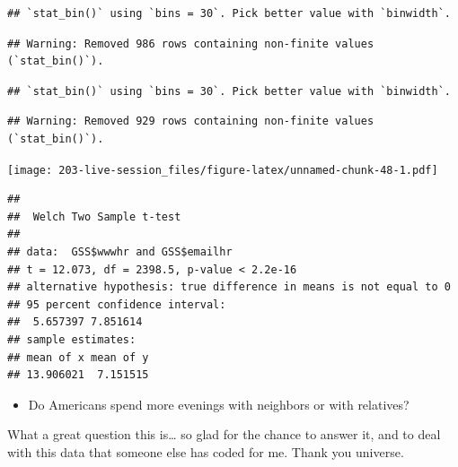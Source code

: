 \documentclass[
]{book}
\newenvironment{Shaded}{\begin{snugshade}}{\end{snugshade}}
\newcommand{\AttributeTok}[1]{\textcolor[rgb]{0.77,0.63,0.00}{#1}}
\newcommand{\ConstantTok}[1]{\textcolor[rgb]{0.00,0.00,0.00}{#1}}
\newcommand{\FunctionTok}[1]{\textcolor[rgb]{0.00,0.00,0.00}{#1}}
\newcommand{\NormalTok}[1]{#1}
\newcommand{\SpecialCharTok}[1]{\textcolor[rgb]{0.00,0.00,0.00}{#1}}
\providecommand{\tightlist}{%
  \setlength{\itemsep}{0pt}\setlength{\parskip}{0pt}}
\theoremstyle{definition}
\theoremstyle{definition}
\theoremstyle{definition}
\theoremstyle{definition}
\theoremstyle{remark}
\begin{document}
\begin{verbatim}
## `stat_bin()` using `bins = 30`. Pick better value with `binwidth`.
\end{verbatim}

\begin{verbatim}
## Warning: Removed 986 rows containing non-finite values (`stat_bin()`).
\end{verbatim}

\begin{verbatim}
## `stat_bin()` using `bins = 30`. Pick better value with `binwidth`.
\end{verbatim}

\begin{verbatim}
## Warning: Removed 929 rows containing non-finite values (`stat_bin()`).
\end{verbatim}

\texttt{[image: 203-live-session\_files/figure-latex/unnamed-chunk-48-1.pdf]}

\begin{Shaded}
\end{Shaded}

\begin{verbatim}
## 
##  Welch Two Sample t-test
## 
## data:  GSS$wwwhr and GSS$emailhr
## t = 12.073, df = 2398.5, p-value < 2.2e-16
## alternative hypothesis: true difference in means is not equal to 0
## 95 percent confidence interval:
##  5.657397 7.851614
## sample estimates:
## mean of x mean of y 
## 13.906021  7.151515
\end{verbatim}

\begin{itemize}
\tightlist
\item
  Do Americans spend more evenings with neighbors or with relatives?
\end{itemize}

What a great question this is\ldots{} so glad for the chance to answer it, and to deal with this data that someone else has coded for me. Thank you universe.
\end{document}
